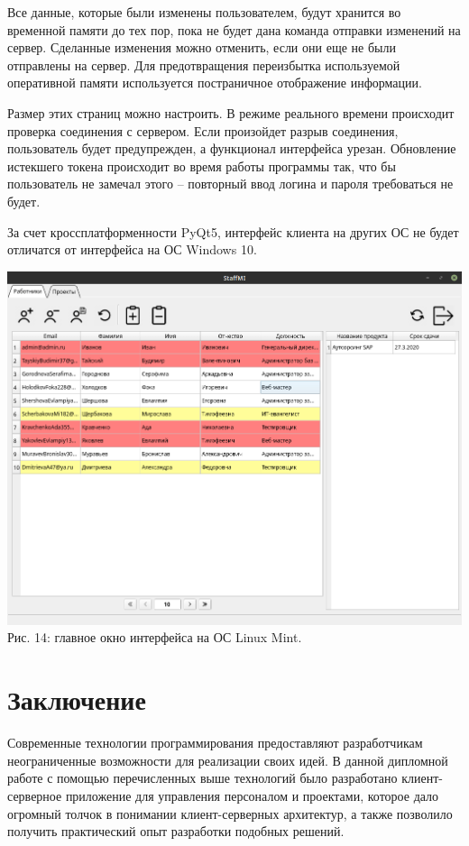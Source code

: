 \documentclass[14pt, a4paper]{extarticle}
\begin{document}
    Все данные, которые были изменены пользователем, будут хранится во временной памяти до тех пор, пока не будет дана команда отправки изменений на сервер. Сделанные изменения можно отменить, если они еще не были отправлены на сервер. Для предотвращения переизбытка используемой оперативной памяти используется постраничное отображение информации.

    Размер этих страниц можно настроить. В режиме реального времени происходит проверка соединения с сервером. Если произойдет разрыв соединения, пользователь будет предупрежден, а функционал интерфейса урезан. Обновление истекшего токена происходит во время работы программы так, что бы пользователь не замечал этого – повторный ввод логина и пароля требоваться не будет.

    За счет кроссплатформенности PyQt5, интерфейс клиента на других ОС не будет отличатся от интерфейса на ОС Windows 10.
    \begin{center}
        \includegraphics[width=\textwidth]{img/main_window_linux.png}\\
        Рис. 14: главное окно интерфейса на ОС Linux Mint.\\[\baselineskip]
    \end{center}


    \newpage
    \section{Заключение}
    Современные технологии программирования предоставляют разработчикам неограниченные возможности для реализации своих идей. В данной дипломной работе с помощью перечисленных выше технологий было разработано клиент-серверное приложение для управления персоналом и проектами, которое дало огромный толчок в понимании клиент-серверных архитектур, а также позволило получить практический опыт разработки подобных решений.
\end{document}
